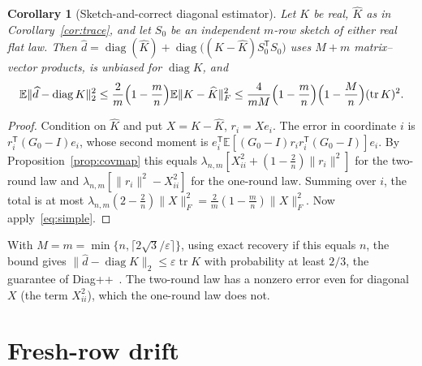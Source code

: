 \documentclass[11pt,a4paper]{article}
\newtheorem{corollary}[theorem]{Corollary}
\theoremstyle{definition}
\theoremstyle{remark}
\numberwithin{equation}{section}
\newcommand{\E}{\mathbb E}
\newcommand{\tr}{\operatorname{tr}}
\newcommand{\diag}{\operatorname{diag}}
\newcommand{\eps}{\varepsilon}
\newcommand{\norm}[1]{\lVert#1\rVert}
\begin{document}
\begin{corollary}[Sketch-and-correct diagonal estimator]\label{cor:diag}
Let $K$ be real, $\widehat K$ as in Corollary~\ref{cor:trace}, and let $S_0$ be an
independent $m$-row sketch of either real flat law. Then
$\widehat d=\diag(\widehat K)+\diag\bigl((K-\widehat K)S_0^{\mathsf T}S_0\bigr)$ uses
$M+m$ matrix--vector products, is unbiased for $\diag K$, and
\[
 \E\norm{\widehat d-\diag K}_2^2\le\frac2m\Bigl(1-\frac mn\Bigr)
 \E\norm{K-\widehat K}_F^2
 \le\frac4{mM}\Bigl(1-\frac mn\Bigr)\Bigl(1-\frac Mn\Bigr)(\tr K)^2 .
\]
\end{corollary}
\begin{proof}
Condition on $\widehat K$ and put $X=K-\widehat K$, $r_i=Xe_i$. The error in
coordinate $i$ is $r_i^{\mathsf T}(G_0-I)e_i$, whose second moment is
$e_i^{\mathsf T}\E[(G_0-I)r_ir_i^{\mathsf T}(G_0-I)]e_i$. By
Proposition~\ref{prop:covmap} this equals
$\lambda_{n,m}[X_{ii}^2+(1-\frac2n)\norm{r_i}^2]$ for the two-round law and
$\lambda_{n,m}[\norm{r_i}^2-X_{ii}^2]$ for the one-round law. Summing over $i$,
the total is at most $\lambda_{n,m}(2-\frac2n)\norm X_F^2=\frac2m(1-\frac mn)\norm X_F^2$.
Now apply~\eqref{eq:simple}.
\end{proof}
With $M=m=\min\{n,\lceil2\sqrt3/\eps\rceil\}$, using exact recovery if this equals $n$,
the bound gives $\norm{\widehat d-\diag K}_2\le\eps\tr K$
with probability at least $2/3$, the guarantee of Diag++~\cite{BN}. The
two-round law has a nonzero error even for diagonal $X$ (the term $X_{ii}^2$),
which the one-round law does not.

\section{Fresh-row drift}\label{sec:drift}
\end{document}
